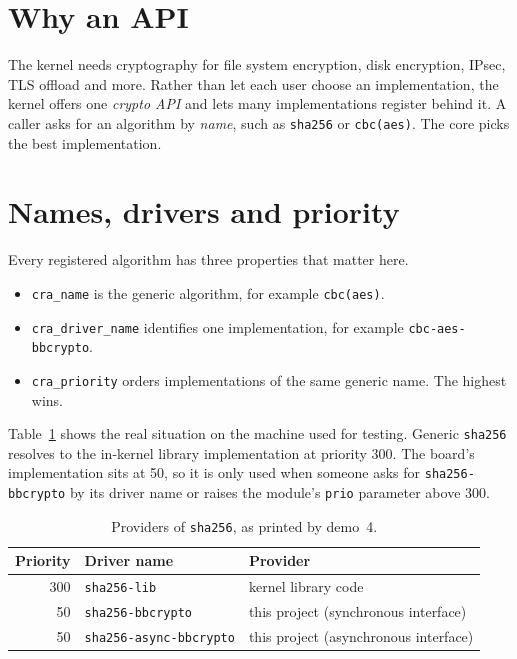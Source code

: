 \documentclass[11pt,a4paper,oneside]{report}
\newcommand{\code}[1]{\texttt{\small #1}}
\begin{document}
\section{Why an API}

The kernel needs cryptography for file system encryption, disk encryption, IPsec, TLS offload and more. Rather than let each user choose an implementation, the kernel offers one \emph{crypto API} and lets many implementations register behind it. A caller asks for an algorithm by \emph{name}, such as \code{sha256} or \code{cbc(aes)}. The core picks the best implementation.

\section{Names, drivers and priority}

Every registered algorithm has three properties that matter here.

\begin{itemize}
  \item \code{cra\_name} is the generic algorithm, for example \code{cbc(aes)}.
  \item \code{cra\_driver\_name} identifies one implementation, for example \code{cbc-aes-bbcrypto}.
  \item \code{cra\_priority} orders implementations of the same generic name. The highest wins.
\end{itemize}

Table~\ref{tab:prio} shows the real situation on the machine used for testing. Generic \code{sha256} resolves to the in-kernel library implementation at priority 300. The board's implementation sits at 50, so it is only used when someone asks for \code{sha256-bbcrypto} by its driver name or raises the module's \code{prio} parameter above 300.

\begin{table}[ht]
\centering
\begin{tabular}{rll}
\toprule
Priority & Driver name & Provider \\
\midrule
300 & \code{sha256-lib} & kernel library code \\
50 & \code{sha256-bbcrypto} & this project (synchronous interface) \\
50 & \code{sha256-async-bbcrypto} & this project (asynchronous interface) \\
\bottomrule
\end{tabular}
\caption{Providers of \code{sha256}, as printed by demo~4.}\label{tab:prio}
\end{table}
\end{document}
